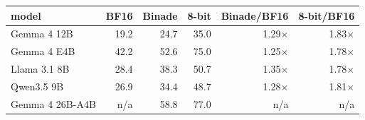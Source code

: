 \begin{tabular}{lrrrrr}
\toprule
model & BF16 & Binade & 8-bit & Binade/BF16 & 8-bit/BF16 \\
\midrule
Gemma 4 12B & 19.2 & 24.7 & 35.0 & 1.29$\times$ & 1.83$\times$ \\
Gemma 4 E4B & 42.2 & 52.6 & 75.0 & 1.25$\times$ & 1.78$\times$ \\
Llama 3.1 8B & 28.4 & 38.3 & 50.7 & 1.35$\times$ & 1.78$\times$ \\
Qwen3.5 9B & 26.9 & 34.4 & 48.7 & 1.28$\times$ & 1.81$\times$ \\
Gemma 4 26B-A4B & n/a & 58.8 & 77.0 & n/a & n/a \\
\bottomrule
\end{tabular}
